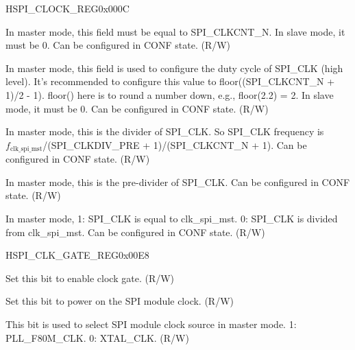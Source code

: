 \begin{register}{H}{SPI\_CLOCK\_REG}{0x000C}\label{regdesc:SPICLOCKREG}
%
%
%
%
%
%
\regnewline%
\begin{regdesc}\begin{reglist}
\label{fielddesc:SPICLKCNTL}\item [SPI\_CLKCNT\_L] In master mode, this field must be equal to SPI\_CLKCNT\_N. In slave mode, it must be 0. Can be configured in CONF state. (R/W)
\label{fielddesc:SPICLKCNTH}\item [SPI\_CLKCNT\_H] In master mode, this field is used to configure the duty cycle of SPI\_CLK (high level). It's recommended to configure this value to floor((SPI\_CLKCNT\_N + 1)/2 - 1). floor() here is to round a number down, e.g., floor(2.2) = 2. In slave mode, it must be 0. Can be configured in CONF state. (R/W)
\label{fielddesc:SPICLKCNTN}\item [SPI\_CLKCNT\_N] In master mode, this is the divider of SPI\_CLK. So SPI\_CLK frequency is $f_{\textrm{clk\_spi\_mst}}$/(SPI\_CLKDIV\_PRE + 1)/(SPI\_CLKCNT\_N + 1). Can be configured in CONF state. (R/W)
\label{fielddesc:SPICLKDIVPRE}\item [SPI\_CLKDIV\_PRE] In master mode, this is the pre-divider of SPI\_CLK. Can be configured in CONF state. (R/W)
\label{fielddesc:SPICLKEQUSYSCLK}\item [SPI\_CLK\_EQU\_SYSCLK] In master mode, 1: SPI\_CLK is equal to clk\_spi\_mst. 0: SPI\_CLK is divided from clk\_spi\_mst. Can be configured in CONF state. (R/W)
\end{reglist}\end{regdesc}
\end{register}


\begin{register}{H}{SPI\_CLK\_GATE\_REG}{0x00E8}\label{regdesc:SPICLKGATEREG}
%
%
%
%
\regnewline%
\begin{regdesc}\begin{reglist}
\label{fielddesc:SPICLKEN}\item [SPI\_CLK\_EN] Set this bit to enable clock gate. (R/W)
\label{fielddesc:SPIMSTCLKACTIVE}\item [SPI\_MST\_CLK\_ACTIVE] Set this bit to power on the SPI module clock. (R/W)
\label{fielddesc:SPIMSTCLKSEL}\item [SPI\_MST\_CLK\_SEL] This bit is used to select SPI module clock source in master mode. 1: PLL\_F80M\_CLK. 0: XTAL\_CLK. (R/W)
\end{reglist}\end{regdesc}
\end{register}


